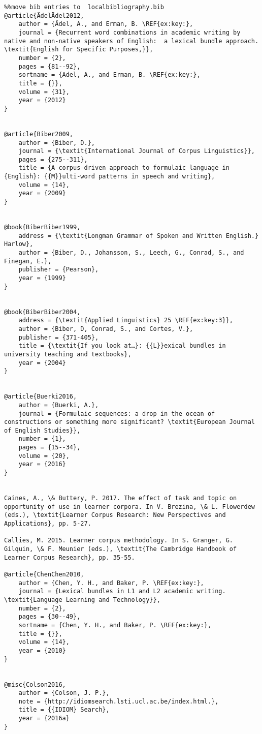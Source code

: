 \documentclass[output=paper]{langsci/langscibook}
\begin{document}
\begin{verbatim}%%move bib entries to  localbibliography.bib
@article{ÄdelÄdel2012,
	author = {Ädel, A., and Erman, B. \REF{ex:key:},
	journal = {Recurrent word combinations in academic writing by native and non-native speakers of English:  a lexical bundle approach. \textit{English for Specific Purposes,}},
	number = {2},
	pages = {81--92},
	sortname = {Adel, A., and Erman, B. \REF{ex:key:},
	title = {}},
	volume = {31},
	year = {2012}
}


@article{Biber2009,
	author = {Biber, D.},
	journal = {\textit{International Journal of Corpus Linguistics}},
	pages = {275--311},
	title = {A corpus-driven approach to formulaic language in {English}: {{M}}ulti-word patterns in speech and writing},
	volume = {14},
	year = {2009}
}


@book{BiberBiber1999,
	address = {\textit{Longman Grammar of Spoken and Written English.} Harlow},
	author = {Biber, D., Johansson, S., Leech, G., Conrad, S., and Finegan, E.},
	publisher = {Pearson},
	year = {1999}
}


@book{BiberBiber2004,
	address = {\textit{Applied Linguistics} 25 \REF{ex:key:3}},
	author = {Biber, D, Conrad, S., and Cortes, V.},
	publisher = {371-405},
	title = {\textit{If you look at…}: {{L}}exical bundles in university teaching and textbooks},
	year = {2004}
}


@article{Buerki2016,
	author = {Buerki, A.},
	journal = {Formulaic sequences: a drop in the ocean of constructions or something more significant? \textit{European Journal of English Studies}},
	number = {1},
	pages = {15--34},
	volume = {20},
	year = {2016}
}


Caines, A., \& Buttery, P. 2017. The effect of task and topic on opportunity of use in learner corpora. In V. Brezina, \& L. Flowerdew (eds.), \textit{Learner Corpus Research: New Perspectives and Applications}, pp. 5-27.

Callies, M. 2015. Learner corpus methodology. In S. Granger, G. Gilquin, \& F. Meunier (eds.), \textit{The Cambridge Handbook of Learner Corpus Research}, pp. 35-55.

@article{ChenChen2010,
	author = {Chen, Y. H., and Baker, P. \REF{ex:key:},
	journal = {Lexical bundles in L1 and L2 academic writing. \textit{Language Learning and Technology}},
	number = {2},
	pages = {30--49},
	sortname = {Chen, Y. H., and Baker, P. \REF{ex:key:},
	title = {}},
	volume = {14},
	year = {2010}
}


@misc{Colson2016,
	author = {Colson, J. P.},
	note = {http://idiomsearch.lsti.ucl.ac.be/index.html.},
	title = {{IDIOM} Search},
	year = {2016a}
}



\end{verbatim}
\end{document}
